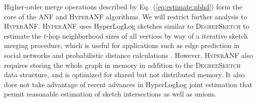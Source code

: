\documentclass[10]{article}
\newcommand{\algoname}[1]{\textnormal{\textsc{#1}}}
\begin{document}
Higher-order merge operations described by Eq.~(\ref{eq:estimate:nbhd}) form the core of the \algoname{ANF} \cite{palmer2002anf} and \algoname{HyperANF} \cite{boldi2011hyperanf} algorithms.
We will restrict further analysis to \algoname{HyperANF}.
\algoname{HyperANF} uses HyperLogLog sketches similar to \algoname{DegreeSketch} to estimate the $t$-hop neighborhood sizes of all vertices by way of a iterative sketch merging procedure, which is useful for applications such as edge prediction in social networks \cite{gupta2013wtf} and probabilistic distance calculations \cite{boldi2011hyperanf, myers2014information}.
However, \algoname{HyperANF} also requires storing the whole graph in memory in addition to the \algoname{DegreeSketch} data structure, and is optimized for shared but not distributed memory. 
It also does not take advantage of recent advances in HyperLogLog joint estimation that permit reasonable estimation of sketch intersections as well as unions.
\end{document}
